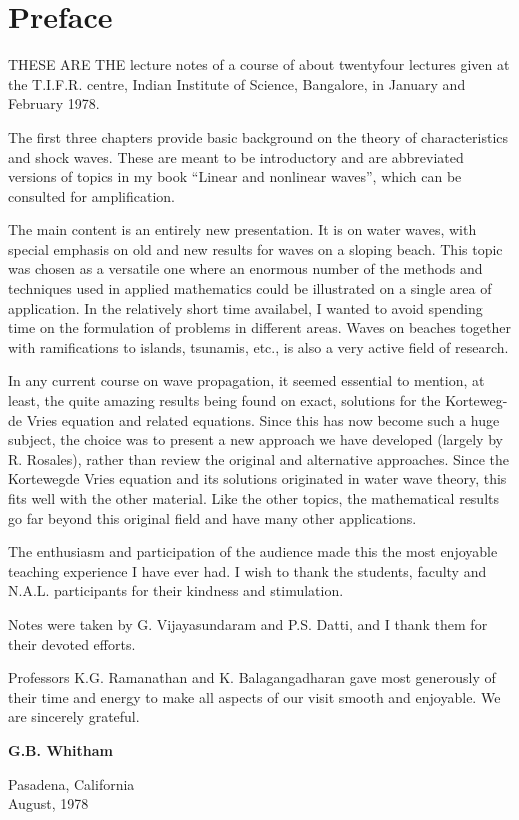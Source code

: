 \eject

\chapter{Preface}


THESE ARE THE lecture notes of a course of about twentyfour lectures
given at the T.I.F.R. centre, Indian Institute of Science, Bangalore,
in January and February 1978. 


The first three chapters provide basic background on the theory of
characteristics and shock waves. These are meant to be introductory
and are abbreviated versions of topics in my book ``Linear and
nonlinear waves'', which can be consulted for amplification. 


The main content is an entirely new presentation. It is on water
waves, with special emphasis on old and new results for waves on a
sloping beach. This topic was chosen as a versatile one where an
enormous number of the methods and techniques used in applied
mathematics could be illustrated on a single area of application. In
the relatively short time availabel, I wanted to avoid spending time
on the formulation of problems in different areas. Waves on beaches
together with ramifications to islands, tsunamis, etc., is also a very
active field of research. 


In any current course on wave propagation, it seemed essential to
mention, at least, the quite amazing results being found on exact,
solutions for the Korteweg-de Vries equation and related
equations. Since this has now become such a huge subject, the choice
was to present a new approach we have developed (largely by
R. Rosales), rather than review the original and alternative
approaches. Since the Kortewegde Vries equation and its solutions
originated in water wave theory, this fits well with the other
material. Like the other topics, the mathematical results go far
beyond this original field and have many other applications.  
\eject

The enthusiasm and participation of the audience made this the most
enjoyable teaching experience I have ever had. I wish to thank the
students, faculty and N.A.L. participants for their kindness and
stimulation. 


Notes were taken by G. Vijayasundaram and P.S. Datti, and I thank them
for their devoted efforts.  

Professors K.G. Ramanathan and K. Balagangadharan gave most generously
of their time and energy to make all aspects of our visit smooth and
enjoyable. We are sincerely grateful. 
\bigskip

\begin{flushright}
{\large\bf G.B. Whitham}
\medskip

Pasadena, California\\

August, 1978
\end{flushright}
